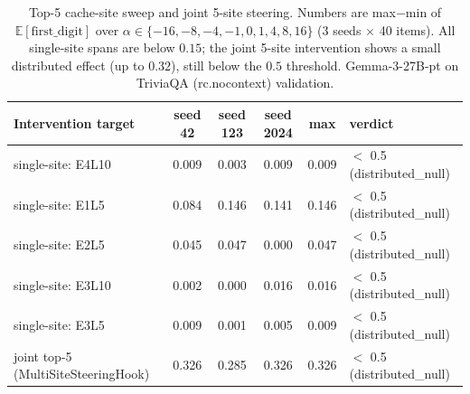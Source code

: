 
\begin{table}[t]
\centering
\caption{Top-5 cache-site sweep and joint 5-site steering.
Numbers are max$-$min of $\mathbb{E}[\text{first\_digit}]$ over
$\alpha \in \{{-16,-8,-4,-1,0,1,4,8,16\}}$ (3 seeds $\times$ 40 items).
All single-site spans are below $0.15$; the joint 5-site intervention shows
a small distributed effect (up to $0.32$), still below the $0.5$ threshold.
Gemma-3-27B-pt on TriviaQA (rc.nocontext) validation.}
\label{tab:c1_top5_site_and_joint_sweep}
\begin{tabular}{lccccl}
\toprule
Intervention target & seed 42 & seed 123 & seed 2024 & max & verdict \\
\midrule
single-site: E4L10 & 0.009 & 0.003 & 0.009 & 0.009 & $<$ 0.5 (distributed\_null) \\
single-site: E1L5 & 0.084 & 0.146 & 0.141 & 0.146 & $<$ 0.5 (distributed\_null) \\
single-site: E2L5 & 0.045 & 0.047 & 0.000 & 0.047 & $<$ 0.5 (distributed\_null) \\
single-site: E3L10 & 0.002 & 0.000 & 0.016 & 0.016 & $<$ 0.5 (distributed\_null) \\
single-site: E3L5 & 0.009 & 0.001 & 0.005 & 0.009 & $<$ 0.5 (distributed\_null) \\
joint top-5 (MultiSiteSteeringHook) & 0.326 & 0.285 & 0.326 & 0.326 & $<$ 0.5 (distributed\_null) \\
\bottomrule
\end{tabular}
\end{table}
